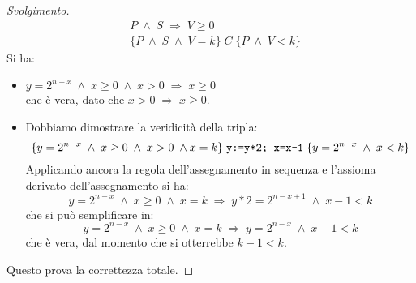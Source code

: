 \documentclass[a4paper, 10pt]{article} %
\begin{document}
\begin{proof}[Svolgimento]
\begin{align*}
& P \; \land \; S \; \Rightarrow \; V \geq 0 \\
& \{P \; \land \; S \; \land \; V=k \} \; C \; \{ P \; \land \; V <k \} 
\end{align*}
Si ha:
\begin{itemize}
\item $ y=2^{n-x} \; \land \; x \geq 0 \; \land \; x>0 \; \Rightarrow \; x \geq 0 $ \\
	  che è vera, dato che $ x>0 \; \Rightarrow \; x \geq 0 $.
\item Dobbiamo dimostrare la veridicità della tripla:
		$$ \{y=2^{n-x} \; \land \; x \geq 0 \; \land \; x>0 \; \land x=k \} \; 
		\text{\texttt{y:=y*2; x=x-1}} 
		\; \{y=2^{n-x} \; \land \; x < k \} $$
	  Applicando ancora la regola dell'assegnamento in sequenza e l'assioma derivato dell'assegnamento si ha:
	  $$ y = 2^{n-x} \; \land \; x \geq 0 \; \land \; x=k \;
	     \Rightarrow 
	     \; y*2 = 2^{n-x+1} \; \land \; x-1<k $$ 
	  che si può semplificare in:
	  $$ y = 2^{n-x} \; \land \; x \geq 0 \; \land \; x=k \;
	     \Rightarrow 
	     \; y = 2^{n-x} \; \land \; x-1<k $$ 
	  che è vera, dal momento che si otterrebbe $ k-1<k $.
\end{itemize}

Questo prova la correttezza totale.
\end{proof}
\end{document}
